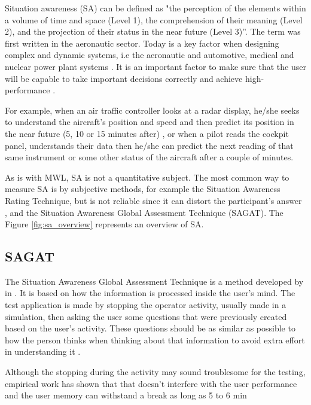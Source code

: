 Situation awareness (SA) can be defined as "the perception of the elements within a volume of time and space (Level 1), the comprehension of their meaning (Level 2), and the projection of their status in the near future (Level 3)”. The term was first written in the aeronautic sector. Today is a key factor when designing complex and dynamic systems, i.e the aeronautic and automotive, medical and nuclear power plant systems \cite{endsley1995measurement}. 
It is an important factor to make sure that the user will be capable to take important decisions correctly and achieve high-performance \cite{endsley1988design, endsley2018automation}. 

For example, when an air traffic controller looks at a radar display, he/she seeks to understand the aircraft's position and speed and then predict its position in the near future (5, 10 or 15 minutes after) \cite{sanders1998human}, or when a pilot reads the cockpit panel, understands their data then he/she can predict the next reading of that same instrument or some other status of the aircraft after a couple of minutes.
    
As is with MWL, SA is not a quantitative subject. The most common way to measure SA is by subjective methods, for example the Situation Awareness Rating Technique, but is not reliable since it can distort the participant's answer \cite{stanton2004handbook}, and the Situation Awareness Global Assessment Technique (SAGAT). The Figure \ref{fig:sa_overview} represents an overview of SA.



    \subsection{SAGAT}
    \label{subsec:sagat}
    
        The Situation Awareness Global Assessment Technique is a method developed by \citeauthor{endsley1988situation} in \citeyear{endsley1988situation}. It is based on how the information is processed inside the user's mind. The test application is made by stopping the operator activity, usually made in a simulation, then asking the user some questions that were previously created based on the user's activity. These questions should be as similar as possible to how the person thinks when thinking about that information to avoid extra effort in understanding it \cite{stanton2004handbook}.

       Although the stopping during the activity may sound troublesome for the testing, empirical work has shown that that doesn't interfere with the user performance and the user memory can withstand a break as long as 5 to 6 min \citeauthor{endsley1995measurement}

